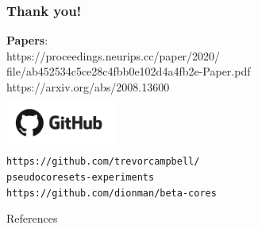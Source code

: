 \documentclass[hyperref={colorlinks = true},unknownkeysallowed]{beamer}
\begin{document}
\begin{frame}
	\frametitle{\textbf{Thank you!}}
	\centering
	\large{\textbf{Papers}}:\\ {https://proceedings.neurips.cc/paper/2020/\\file/ab452534c5ce28c4fbb0e102d4a4fb2e-Paper.pdf}\\{https://arxiv.org/abs/2008.13600}\\
	\vspace{1cm}
	\includegraphics[width=3.6cm,height=1.8cm]{figs/github-logo.png}\\
	\texttt{https://github.com/trevorcampbell/\\pseudocoresets-experiments}\\ \texttt{https://github.com/dionman/beta-cores}
\end{frame}


\begin{frame}[allowframebreaks]{References}
	\tiny %
	
\end{frame}
\end{document}
